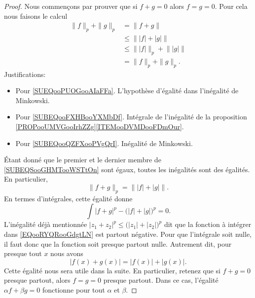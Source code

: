 \begin{proof}
	Nous commençons par prouver que si \( f+g=0\) alors \( f=g=0\). Pour cela nous faisons le calcul
	\begin{subequations}		\label{SUBEQSooGHMTooWSTtOn}
		\begin{align}
			\| f \|_p+\| g \|_p & =\| f+g \|		\label{SUEQooPUOGooAIaFFa}                                        \\
			                    & \leq \big\| | f |+| g |  \big\|		\label{SUBEQooFXHBooYXMbDf}                  \\
			                    & \leq \big\| | f |  \big\|_p+\big\|  | g | \big\|	\label{SUBEQooQZFXooPVgQrI} \\
			                    & = \| f \|_p+\| g \|_p.
		\end{align}
	\end{subequations}
	Justifications:
	\begin{itemize}
		\item
		      Pour \eqref{SUEQooPUOGooAIaFFa}. L'hypothèse d'égalité dans l'inégalité de Minkowski.
		\item
		      Pour \eqref{SUBEQooFXHBooYXMbDf}. Intégrale de l'inégalité de la proposition \ref{PROPooUMVGooIrhZZg}\ref{ITEMooDVMDooFDmOur}.
		\item
		      Pour \eqref{SUBEQooQZFXooPVgQrI}. Inégalité de Minkowski.
	\end{itemize}
	Étant donné que le premier et le dernier membre de \eqref{SUBEQSooGHMTooWSTtOn} sont égaux, toutes les inégalités sont des égalités. En particulier,
	\begin{equation}
		\| f+g \|_p=\big\| | f |+| g |  \big\|.
	\end{equation}
	En termes d'intégrales, cette égalité donne
	\begin{equation}		\label{EQooRYQRooGdgtLN}
		\int| f+g |^p-\big( | f |+| g | \big)^p=0.
	\end{equation}
	L'inégalité déjà mentionnée \( | z_1+z_2 |^p\leq \big( | z_1 |+| z_2 | \big)^p\) dit que la fonction à intégrer dans \eqref{EQooRYQRooGdgtLN} est partout négative. Pour que l'intégrale soit nulle, il faut donc que la fonction soit presque partout nulle. Autrement dit, pour presque tout \( x\) nous avons
	\begin{equation}		\label{EQooULHAooWXViEH}
		| f(x)+g(x) |=| f(x) |+| g(x) |.
	\end{equation}
	Cette égalité nous sera utile dans la suite. En particulier, retenez que si \( f+g=0\) presque partout, alors \( f=g=0\) presque partout. Dans ce cas, l'égalité \( \alpha f+\beta g=0\) fonctionne pour tout \( \alpha\) et \( \beta\).


\end{proof}
